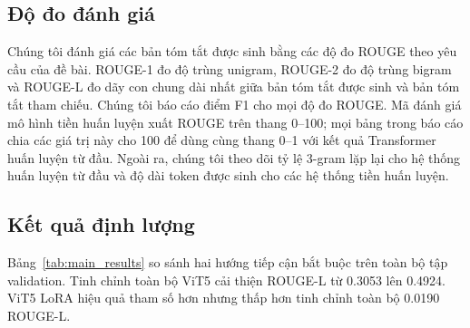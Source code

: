 \documentclass[conference]{IEEEtran}
\begin{document}
\subsection{Độ đo đánh giá}
Chúng tôi đánh giá các bản tóm tắt được sinh bằng các độ đo ROUGE \cite{lin2004rouge} theo yêu cầu của đề bài. ROUGE-1 đo độ trùng unigram, ROUGE-2 đo độ trùng bigram và ROUGE-L đo dãy con chung dài nhất giữa bản tóm tắt được sinh và bản tóm tắt tham chiếu. Chúng tôi báo cáo điểm F1 cho mọi độ đo ROUGE. Mã đánh giá mô hình tiền huấn luyện xuất ROUGE trên thang 0--100; mọi bảng trong báo cáo chia các giá trị này cho 100 để dùng cùng thang 0--1 với kết quả Transformer huấn luyện từ đầu. Ngoài ra, chúng tôi theo dõi tỷ lệ 3-gram lặp lại cho hệ thống huấn luyện từ đầu và độ dài token được sinh cho các hệ thống tiền huấn luyện.

\subsection{Kết quả định lượng}
Bảng~\ref{tab:main_results} so sánh hai hướng tiếp cận bắt buộc trên toàn bộ tập validation. Tinh chỉnh toàn bộ ViT5 cải thiện ROUGE-L từ 0.3053 lên 0.4924. ViT5 LoRA hiệu quả tham số hơn nhưng thấp hơn tinh chỉnh toàn bộ 0.0190 ROUGE-L.

\begin{table}[htbp]
\centering
\caption{Kết quả chính trên toàn bộ tập validation.}
\label{tab:main_results}
\end{table}

\begin{table}[htbp]
\centering
\caption{So sánh giải mã trên validation bằng cùng checkpoint đã huấn luyện.}
\label{tab:decoding_results}
\end{table}
\end{document}
